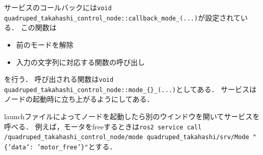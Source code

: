 \documentclass[a4paper]{jlreq}
\begin{document}
サービスのコールバックには\texttt{void quadruped\_takahashi\_control\_node::callback\_mode\_(...)}が設定されている．
この関数は
\begin{itemize}
  \item 前のモードを解除
  \item 入力の文字列に対応する関数の呼び出し
\end{itemize}
を行う．
呼び出される関数は\texttt{void quadruped\_takahashi\_control\_node::mode\_\{\}\_(...)}としてある．
サービスはノードの起動時に立ち上がるようにしてある．

launchファイルによってノードを起動したら別のウインドウを開いてサービスを呼べる．
例えば，モータをfreeするときは\texttt{ros2 service call /quadruped\_takahashi\_control\_node/mode quadruped\_takahashi/srv/Mode "\{'data': 'motor\_free'\}"}とする．
\end{document}
